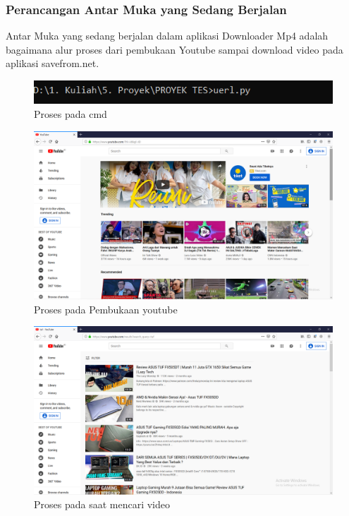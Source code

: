 \subsubsection{Perancangan Antar Muka yang Sedang Berjalan}
Antar Muka yang sedang berjalan dalam aplikasi Downloader Mp4 adalah bagaimana alur proses dari pembukaan Youtube sampai download video pada aplikasi savefrom.net.

\begin{figure}[!htbp]
    \centering
    \includegraphics[scale=1.5]{figure/CMD.png}
    \caption{Proses pada cmd }
    \label{gambar 1}
\end{figure}

\begin{figure}[!htbp]
    \centering
    \includegraphics[scale=0.4]{figure/Antarmuka/1.png}
    \caption{ Proses pada Pembukaan youtube}
    \label{gambar 1}
\end{figure}

\begin{figure}[!htbp]
    \centering
    \includegraphics[scale=0.4]{figure/Antarmuka/2.png}
    \caption{ Proses pada saat mencari video}
    \label{gambar 1}
\end{figure}

